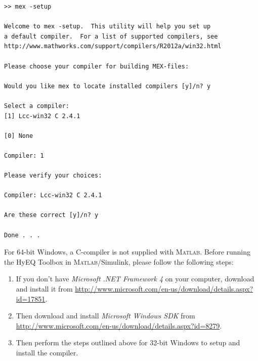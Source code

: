 \documentclass{article}
\newcommand{\matlab}{\textsc{Matlab}}
\begin{document}
\begin{verbatim}
>> mex -setup

Welcome to mex -setup.  This utility will help you set up
a default compiler.  For a list of supported compilers, see
http://www.mathworks.com/support/compilers/R2012a/win32.html

Please choose your compiler for building MEX-files:

Would you like mex to locate installed compilers [y]/n? y

Select a compiler:
[1] Lcc-win32 C 2.4.1

[0] None

Compiler: 1

Please verify your choices:

Compiler: Lcc-win32 C 2.4.1

Are these correct [y]/n? y

Done . . .
\end{verbatim}

For 64-bit Windows, a C-compiler is not supplied with \matlab{}. Before running the HyEQ Toolbox in \matlab{}/Simulink, please follow the following steps:

\begin{enumerate}
\item If you don't have {\em Microsoft .NET Framework 4} on your computer, download and install it from
\url{http://www.microsoft.com/en-us/download/details.aspx?id=17851}.
\item Then download and install {\em Microsoft Windows SDK} from
\url{http://www.microsoft.com/en-us/download/details.aspx?id=8279}.
\item Then perform the steps outlined above for 32-bit Windows to setup and install the compiler.
\end{enumerate}
\end{document}
